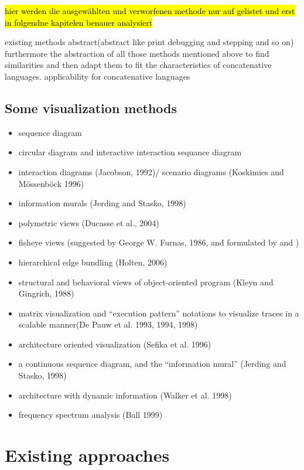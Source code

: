 \hl{hier werden die ausgewählten und verworfenen methode nur auf gelistet und erst in folgendne kapitelen benauer analysiert}

existing methods abstract(abstract like print debugging and stepping and so on) furthermore the abstraction of all those methods mentioned above to find similarities and then adapt them to fit the characteristics of concatenative languages.
applicability for concatenative languages

\subsection{Some visualization methods}

\begin{itemize}
\item sequence diagram
\item circular diagram and interactive interaction sequance diagram \cite{Cornelissen2009}
\item interaction diagrams (Jacobson, 1992)/ scenario diagrams (Koskimies and Mössenböck 1996)
\item information murals (Jerding and Stasko, 1998)
\item polymetric views (Ducasse et al., 2004)
\item fisheye views (suggested by George W. Furnas, 1986, and formulated by \cite{Storey:1995:GLA:647547.728600} and \cite{Sarkar:1994:GFV:198366.198384})
\item hierarchical edge bundling (Holten, 2006)
\item structural and behavioral views of object-oriented program (Kleyn and Gingrich, 1988)
\item matrix visualization and “execution pattern” notations \cite{Pauw98executionpatterns} to visualize traces in a scalable manner(De Pauw et al. 1993, 1994, 1998) 
\item architecture oriented visualization (Sefika et al. 1996)
\item a continuous sequence diagram, and the “information mural” (Jerding and Stasko, 1998)
\item architecture with dynamic information (Walker et al. 1998)
\item frequency spectrum analysis (Ball 1999)
\end{itemize}

\section{Existing approaches}

